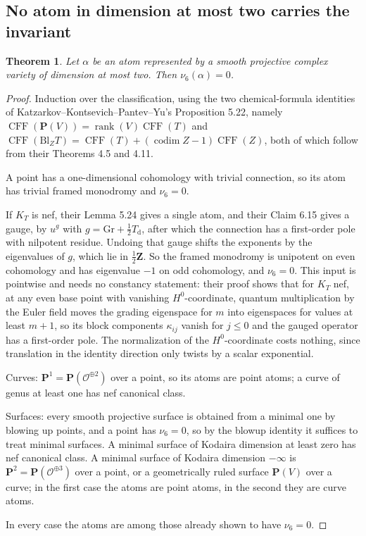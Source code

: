 \documentclass[11pt]{article}
\newtheorem{theorem}{Theorem}
\theoremstyle{definition}
\theoremstyle{remark}
\newcommand{\Z}{\mathbf Z}
\newcommand{\PP}{\mathbf P}
\begin{document}
\subsection*{No atom in dimension at most two carries the invariant}

\begin{theorem}
\label{thm:low-dim}
Let $\alpha$ be an atom represented by a smooth projective complex variety of
dimension at most two. Then $\nu_6(\alpha)=0$.
\end{theorem}

\begin{proof}
Induction over the classification, using the two chemical-formula identities of
Katzarkov--Kontsevich--Pantev--Yu's Proposition 5.22, namely
$\operatorname{CFF}(\PP(V))=\operatorname{rank}(V)\operatorname{CFF}(T)$ and
$\operatorname{CFF}(\mathrm{Bl}_ZT)=\operatorname{CFF}(T)
+(\operatorname{codim}Z-1)\operatorname{CFF}(Z)$, both of which follow from their
Theorems 4.5 and 4.11.

A point has a one-dimensional cohomology with trivial connection, so its atom
has trivial framed monodromy and $\nu_6=0$.

If $K_T$ is nef, their Lemma 5.24 gives a single atom, and their Claim 6.15
gives a gauge, by $u^{g}$ with $g=\mathrm{Gr}+\tfrac12T_{\mathrm d}$, after which
the connection has a first-order pole with nilpotent residue. Undoing that gauge
shifts the exponents by the eigenvalues of $g$, which lie in $\tfrac12\Z$. So
the framed monodromy is unipotent on even cohomology and has eigenvalue $-1$ on
odd cohomology, and $\nu_6=0$. This input is pointwise and needs no constancy
statement: their proof shows that for $K_T$ nef, at any even base point with
vanishing $H^0$-coordinate, quantum multiplication by the Euler field moves the
grading eigenspace for $m$ into eigenspaces for values at least $m+1$, so its
block components $\kappa_{ij}$ vanish for $j\le0$ and the gauged operator has a
first-order pole. The normalization of the $H^0$-coordinate costs nothing, since
translation in the identity direction only twists by a scalar exponential.

Curves: $\PP^1=\PP(\mathcal O^{\oplus2})$ over a point, so its atoms are point
atoms; a curve of genus at least one has nef canonical class.

Surfaces: every smooth projective surface is obtained from a minimal one by
blowing up points, and a point has $\nu_6=0$, so by the blowup identity it
suffices to treat minimal surfaces. A minimal surface of Kodaira dimension at
least zero has nef canonical class. A minimal surface of Kodaira dimension
$-\infty$ is $\PP^2=\PP(\mathcal O^{\oplus3})$ over a point, or a geometrically
ruled surface $\PP(V)$ over a curve; in the first case the atoms are point
atoms, in the second they are curve atoms.

In every case the atoms are among those already shown to have $\nu_6=0$.
\end{proof}
\end{document}
